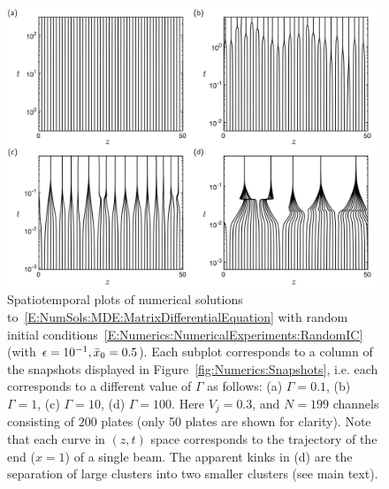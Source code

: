\begin{figure}[t]
\centering
\includegraphics[width = \textwidth]{Spatiotemporal_combined.pdf}
\caption{Spatiotemporal plots of numerical solutions to~\eqref{E:NumSols:MDE:MatrixDifferentialEquation} with random initial conditions~\eqref{E:Numerics:NumericalExperiments:RandomIC} (with $\epsilon = 10^{-1}, \bar{x}_0 = 0.5$). Each subplot corresponds to a column of the snapshots displayed in Figure~\ref{fig:Numerics:Snapshots}, i.e. each  corresponds to a different value of $\Gamma$ as follows: (a) $\Gamma = 0.1$, (b) $\Gamma = 1$, (c) $\Gamma = 10$, (d) $\Gamma = 100$. Here $V_j = 0.3$, and $N=199$ channels consisting of $200$ plates (only 50 plates are shown for clarity).  Note that each curve in $(z,t)$ space corresponds to the trajectory of the end ($x=1$) of a single beam. The apparent kinks in (d) are the separation of large clusters into two smaller clusters (see main text).}\label{fig:Numerics:Spatiotemporal}
\end{figure}

